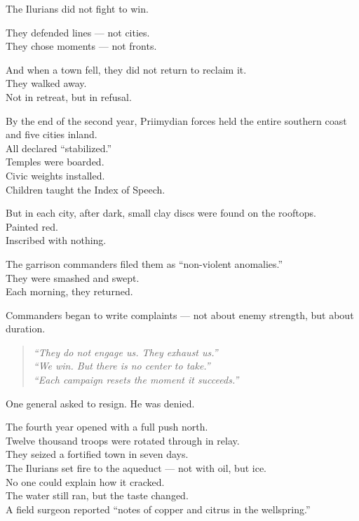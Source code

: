 \documentclass[9pt]{article}
\begin{document}
\vspace{1em}

The Ilurians did not fight to win.

They defended lines — not cities.\\
They chose moments — not fronts.

And when a town fell, they did not return to reclaim it.\\
They walked away.\\
Not in retreat, but in refusal.

\vspace{1em}

By the end of the second year, Priimydian forces held the entire southern coast and five cities inland.\\
All declared “stabilized.”\\
Temples were boarded.\\
Civic weights installed.\\
Children taught the Index of Speech.

But in each city, after dark, small clay discs were found on the rooftops.\\
Painted red.\\
Inscribed with nothing.

The garrison commanders filed them as “non-violent anomalies.”\\
They were smashed and swept.\\
Each morning, they returned.

\vspace{1em}

Commanders began to write complaints — not about enemy strength, but about duration.

\begin{quote}
\textit{“They do not engage us. They exhaust us.”}\\
\textit{“We win. But there is no center to take.”}\\
\textit{“Each campaign resets the moment it succeeds.”}
\end{quote}

One general asked to resign. He was denied.

\vspace{1em}

The fourth year opened with a full push north.\\
Twelve thousand troops were rotated through in relay.\\
They seized a fortified town in seven days.\\
The Ilurians set fire to the aqueduct — not with oil, but ice.\\
No one could explain how it cracked.\\
The water still ran, but the taste changed.\\
A field surgeon reported “notes of copper and citrus in the wellspring.”
\end{document}
